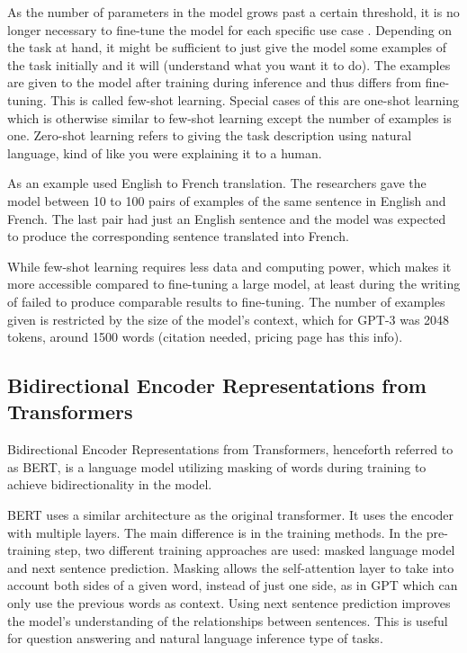 \documentclass[twoside]{article}
\begin{document}
As the number of parameters in the model grows past a certain threshold, it
is no longer necessary to fine-tune the model for each specific use case 
\cite{brown_language_2020}. Depending on the task at hand, it might be sufficient
to just give the model some examples of the task initially and it will (understand what you want it to do). The examples are given to
the model after training during inference and thus differs from fine-tuning. 
This is called few-shot learning. Special cases of this are one-shot learning which is
otherwise similar to few-shot learning except the number of examples is one.
Zero-shot learning refers to giving the task description using natural language,
kind of like you were explaining it to a human. 

As an example \cite{brown_language_2020} used English to French translation.
The researchers gave the model between 10 to 100 pairs of examples of the
same sentence in English and French. The last pair had just an English sentence
and the model was expected to produce the corresponding sentence translated into
French.

While few-shot learning requires less data and computing power, which makes it more
accessible compared to fine-tuning a large model, at least during the writing of 
\cite{brown_language_2020} failed to produce comparable results to fine-tuning.
The number of examples given is restricted by the size of the model's context,
which for GPT-3 was 2048 tokens, around 1500 words (citation needed, pricing page has this info).

\subsection{Bidirectional Encoder Representations from Transformers}
Bidirectional Encoder Representations from Transformers, henceforth referred to as BERT,
is a language model utilizing masking of words during training to achieve bidirectionality
in the model. \cite{devlin_bert_2019}

BERT uses a similar architecture as the original transformer. It uses the encoder with
multiple layers. The main difference is in the training methods. In the pre-training step,
two different training approaches are used: masked language model and next sentence prediction.
Masking allows the self-attention layer to take into account both sides of a given word, instead
of just one side, as in GPT which can only use the previous words as context. Using next sentence
prediction improves the model's understanding of the relationships between sentences. This is
useful for question answering and natural language inference type of tasks. \cite{devlin_bert_2019}
\end{document}
